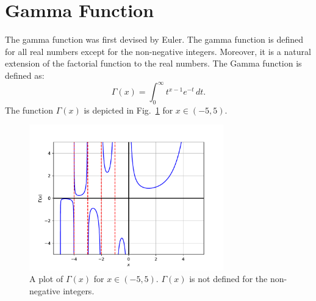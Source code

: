 \documentclass{article}
\theoremstyle{theorem}
\theoremstyle{definition}
\begin{document}
\section{Gamma Function}
The gamma function was first devised by Euler. The gamma function is defined for all real numbers except for the non-negative integers. Moreover, it is a natural extension of the factorial function to the real numbers. The Gamma function is defined as:
\begin{equation}
\Gamma(x) = \int_0^{\infty} t^{x-1} e^{-t}\,dt.
\end{equation}
The function $\Gamma(x)$ is depicted in Fig.~\ref{fig:gamma} for $x\in(-5,5)$.
\begin{figure}[htb]
\centering
\includegraphics[width=0.75\textwidth]{gamma.pdf}
\caption{A plot of $\Gamma(x)$ for $x\in(-5,5)$. $\Gamma(x)$ is not defined for the non-negative integers.}
\label{fig:gamma}
\end{figure}
\end{document}
